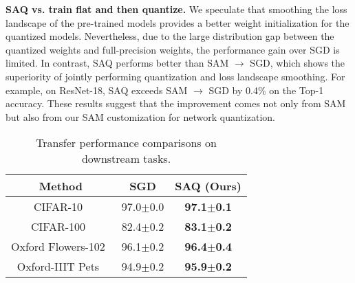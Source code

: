 \noindent\textbf{SAQ vs. train flat and then quantize.}
We speculate that smoothing the loss landscape of the pre-trained models provides a better weight initialization for the quantized models.
Nevertheless, due to the large distribution gap between the quantized weights and full-precision weights, the performance gain over SGD is limited.
In contrast, SAQ performs better than SAM $\rightarrow$ SGD, which shows the superiority of jointly performing quantization and loss landscape smoothing. For example, on ResNet-18, SAQ exceeds SAM $\rightarrow$ SGD by 0.4\% on the Top-1 accuracy.
These results suggest that the improvement comes not only from SAM but also from our SAM customization for network quantization.

\begin{table}[t]
\renewcommand{\arraystretch}{1.3}
\caption{Transfer performance comparisons on downstream tasks. 
}
\vspace{-0.1in}
\centering
\scalebox{0.72}
{
\begin{tabular}{ccc}
\toprule
Method & SGD & SAQ (Ours) \\
\midrule
CIFAR-10~\cite{krizhevsky2009learning} & 97.0$\pm$0.0 & \textbf{97.1$\pm$0.1} \\
CIFAR-100~\cite{krizhevsky2009learning} & 82.4$\pm$0.2 & \textbf{83.1$\pm$0.2} \\
Oxford Flowers-102~\cite{parkhi2012cats} & 96.1$\pm$0.2 & \textbf{96.4$\pm$0.4} \\
Oxford-IIIT Pets~\cite{nilsback2008automated} & 94.9$\pm$0.2 & \textbf{95.9$\pm$0.2} \\
\bottomrule
\end{tabular}
}
\label{table:transfer_results}
\vspace{-0.22in}
\end{table}


